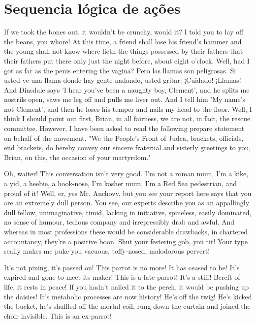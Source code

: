 \documentclass[
	12pt,				%
	openright,			%
	twoside,			%
	a4paper,			%
	english,			%
	french,				%
	brazil,				%
	sumario=tradicional
]{abntex2}
\begin{document}
\section{Sequencia lógica de ações}

If we took the bones out, it wouldn't be crunchy, would it? I told you to lay off the beans, you whore! At this time, a friend shall lose his friend's hammer and the young shall not know where lieth the things possessed by their fathers that their fathers put there only just the night before, about eight o'clock. Well, had I got as far as the penis entering the vagina? Pero las llamas son peligrosas. Si usted ve una llama donde hay gente﻿ nadando, usted gritar: ¡Cuidado! ¡Llamas! And Dinsdale says 'I hear you've been a naughty boy, Clement', and he splits me nostrils open, saws me leg off and pulls me liver out. And I tell him 'My name's not Clement', and then he loses his temper and nails my head to the floor. Well, I think I should point out first, Brian, in all fairness, we are not, in fact, the rescue committee. However, I have been asked to read the following prepare statement on behalf of the movement. "We the People's Front of Judea, brackets, officials, end brackets, do hereby convey our sincere fraternal and sisterly greetings to you, Brian, on this, the occasion of your martyrdom."

Oh, waiter! This conversation isn't very good. I'm not a roman mum, I'm a kike, a yid, a heebie, a hook-nose, I'm kosher mum, I'm a Red Sea pedestrian, and proud of it! Well, er, yes Mr. Anchovy, but you see your report here says that you are an extremely dull person. You see, our experts describe you as an appallingly dull fellow, unimaginative, timid, lacking in initiative, spineless, easily dominated, no sense of humour, tedious company and irrepressibly drab and awful. And whereas in most professions these would be considerable drawbacks, in chartered accountancy, they're a positive boon. Shut your festering gob, you tit! Your type really makes me puke you vacuous, toffy-nosed, malodorous pervert!

It's not pining, it's passed on! This parrot is no more! It has ceased to be! It's expired and gone to meet its maker! This is a late parrot! It's a stiff! Bereft of life, it rests in peace! If you hadn't nailed it to the perch, it would be pushing up the daisies! It's metabolic processes are now history! He's off the twig! He's kicked the bucket, he's shuffled off the mortal coil, rung down the curtain and joined the choir invisible. This is an ex-parrot!
\end{document}
